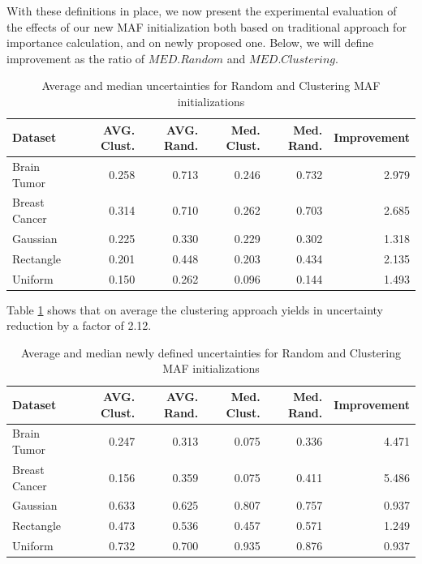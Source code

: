 \documentclass[10pt,a4paper,oneside]{article}
\begin{document}
{\color{black}With these definitions in place, we now present the experimental evaluation of the effects of our new MAF initialization both based on traditional approach for importance calculation, and on newly proposed one.} Below, we will define improvement as the ratio of $MED. Random$ and $MED. Clustering$.

\FloatBarrier

\begin{table}[htbp]
    \centering
    \begin{tabular}{l|r|r|r|r|r}
    \toprule
    Dataset & AVG. Clust. & AVG. Rand. & Med. Clust. & Med. Rand. & Improvement \\
    \midrule
    Brain Tumor & 0.258 & 0.713 & 0.246 & 0.732 & 2.979 \\
    Breast Cancer & 0.314 & 0.710 & 0.262 & 0.703 & 2.685 \\
    Gaussian & 0.225 & 0.330 & 0.229 & 0.302 & 1.318 \\
    Rectangle & 0.201 & 0.448 & 0.203 & 0.434 & 2.135 \\
    Uniform & 0.150 & 0.262 & 0.096 & 0.144 & 1.493 \\
    \bottomrule
    \end{tabular}
    \caption{Average and median uncertainties for Random and Clustering MAF initializations}
    \label{uncerct_res}
\end{table}
 Table \ref{uncerct_res} shows that on average the clustering approach yields in uncertainty reduction by a factor of 2.12.

\newpage
\FloatBarrier
\begin{table}[htbp]
    \centering
    \begin{tabular}{l|r|r|r|r|r}
    \toprule
    Dataset & AVG. Clust. & AVG. Rand. & Med. Clust. & Med. Rand. & Improvement \\
    \midrule
    Brain Tumor & 0.247 & 0.313 & 0.075 & 0.336 & 4.471 \\
    Breast Cancer & 0.156 & 0.359 & 0.075 & 0.411 & 5.486 \\
    Gaussian & 0.633 & 0.625 & 0.807 & 0.757 & 0.937 \\
    Rectangle & 0.473 & 0.536 & 0.457 & 0.571 & 1.249 \\
    Uniform & 0.732 & 0.700 & 0.935 & 0.876 & 0.937 \\
    \bottomrule

    \end{tabular}
    \caption{Average and median newly defined uncertainties for Random and Clustering MAF initializations}
    \label{new_unce_res}

\end{table}
\end{document}
